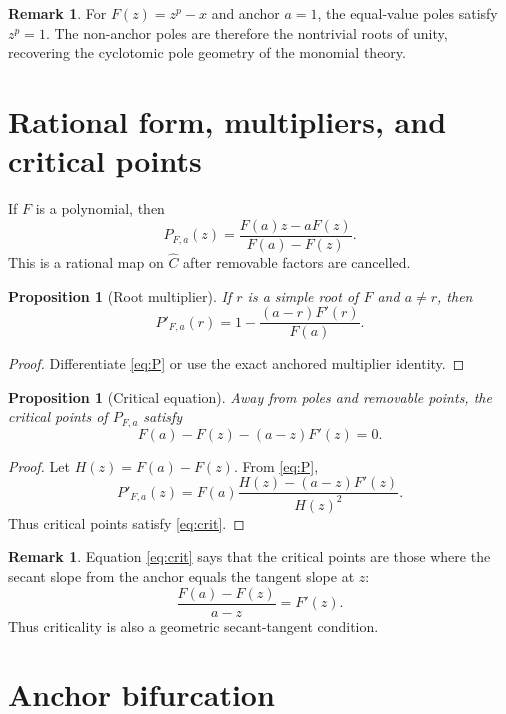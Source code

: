 \documentclass[11pt]{article}
\newtheorem{proposition}[theorem]{Proposition}
\theoremstyle{definition}
\newtheorem{remark}[theorem]{Remark}
\begin{document}
\begin{remark}
For $F(z)=z^p-x$ and anchor $a=1$, the equal-value poles satisfy $z^p=1$. The non-anchor poles are therefore the nontrivial roots of unity, recovering the cyclotomic pole geometry of the monomial theory.
\end{remark}

\section{Rational form, multipliers, and critical points}

If $F$ is a polynomial, then
\begin{equation}\label{eq:ratform}
P_{F,a}(z)=\frac{F(a)z-aF(z)}{F(a)-F(z)}.
\end{equation}
This is a rational map on $\widehat C$ after removable factors are cancelled.

\begin{proposition}[Root multiplier]\label{prop:mult}
If $r$ is a simple root of $F$ and $a\neq r$, then
\[
P'_{F,a}(r)=1-\frac{(a-r)F'(r)}{F(a)}.
\]
\end{proposition}

\begin{proof}
Differentiate \eqref{eq:P} or use the exact anchored multiplier identity.
\end{proof}

\begin{proposition}[Critical equation]\label{prop:critical}
Away from poles and removable points, the critical points of $P_{F,a}$ satisfy
\begin{equation}\label{eq:crit}
F(a)-F(z)-(a-z)F'(z)=0.
\end{equation}
\end{proposition}

\begin{proof}
Let $H(z)=F(a)-F(z)$. From \eqref{eq:P},
\[
P'_{F,a}(z)=F(a)\frac{H(z)-(a-z)F'(z)}{H(z)^2}.
\]
Thus critical points satisfy \eqref{eq:crit}.
\end{proof}

\begin{remark}
Equation \eqref{eq:crit} says that the critical points are those where the secant slope from the anchor equals the tangent slope at $z$:
\[
\frac{F(a)-F(z)}{a-z}=F'(z).
\]
Thus criticality is also a geometric secant-tangent condition.
\end{remark}

\section{Anchor bifurcation}
\end{document}
